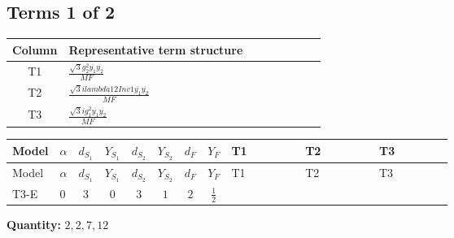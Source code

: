 \documentclass[8pt]{article}
\begin{document}
\begin{landscape}
\subsection*{Terms 1 of 2}
\begin{center}
\begin{tabular}{@{}c >{\raggedright\arraybackslash}p{0.82\linewidth}@{}}
\toprule
Column & Representative term structure \\
\midrule
T1 & \(\displaystyle \frac{\sqrt{3} g_{2}^{2} \overline{y_{1}} \overline{y_{2}}}{MF}\) \\
\midrule
T2 & \(\displaystyle \frac{\sqrt{3} i lambda12Inv1 \overline{y_{1}} \overline{y_{2}}}{MF}\) \\
\midrule
T3 & \(\displaystyle \frac{\sqrt{3} i g_{1}^{2} \overline{y_{1}} \overline{y_{2}}}{MF}\) \\
\midrule
\bottomrule
\end{tabular}
\end{center}
\smallskip
\tiny
\begin{longtable}{@{}llcccccc >{\raggedright\arraybackslash}p{0.21\linewidth} >{\raggedright\arraybackslash}p{0.21\linewidth} >{\raggedright\arraybackslash}p{0.21\linewidth}@{}}
\toprule
Model & $\alpha$ & $d_{S_1}$ & $Y_{S_1}$ & $d_{S_2}$ & $Y_{S_2}$ & $d_F$ & $Y_F$ & T1 & T2 & T3 \\
\midrule
\endfirsthead
\toprule
Model & $\alpha$ & $d_{S_1}$ & $Y_{S_1}$ & $d_{S_2}$ & $Y_{S_2}$ & $d_F$ & $Y_F$ & T1 & T2 & T3 \\
\midrule
\endhead
T3-E & $0$ & $3$ & $0$ & $3$ & $1$ & $2$ & $\frac{1}{2}$ & \scriptsize\adjustbox{max width=\linewidth}{$\begin{gathered} \frac{\sqrt{3} g_{2}^{2} \overline{y_{1}} \overline{y_{2}}}{6 MF}\end{gathered}$} & \scriptsize\adjustbox{max width=\linewidth}{$\begin{gathered} - \frac{\sqrt{3} i lambda12Inv1 \overline{y_{1}} \overline{y_{2}}}{6 MF}\end{gathered}$} & \scriptsize\adjustbox{max width=\linewidth}{$\begin{gathered} \frac{\sqrt{3} i g_{1}^{2} \overline{y_{1}} \overline{y_{2}}}{8 MF}\end{gathered}$} \\
\midrule
\bottomrule
\end{longtable}
\clearpage
\noindent\textbf{Quantity: }$\mathrm{2,2,7,12}$\par\smallskip

\end{landscape}
\end{document}
